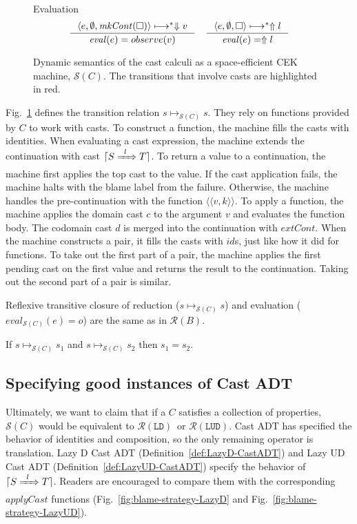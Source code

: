 \documentclass[runningheads]{llncs}
\newcommand{\infr}[2]{\inference{#1}{#2}}
\newcommand{\figref}[1]{Fig.~\ref{#1}}
\newcommand{\RMachine}[1]{\ensuremath{\mathcal{R}(#1)}}
\newcommand{\LDMachine}{\RMachine{\BLD}}
\newcommand{\LUDMachine}{\RMachine{\BLUD}}
\newcommand{\SMachine}[1]{\ensuremath{\mathcal{S}(#1)}}
\newcommand{\error}[1]{\ensuremath{\Uparrow#1}}
\newcommand{\ccast}[3]{#1 \xRightarrow[]{\enskip #2 \enskip} #3}
\newcommand{\BLD}[0]{\ensuremath{\mathtt{LD}}}
\newcommand{\BLUD}[0]{\ensuremath{\mathtt{LUD}}}
\newcommand{\sexpr}[3]{\ensuremath{\langle#1,#2,#3\rangle}}
\newcommand{\shalt}[1]{\ensuremath{\Downarrow #1}}
\newcommand{\Knil}[0]{\Box}
\newcommand{\translate}[1]{\ensuremath{\lceil#1\rceil}}
\newcommand{\mkCont}[1]{\ensuremath{\mathit{mkCont}(#1)}}
\newcommand{\applyCont}[2]{\ensuremath{\langle\langle#1,#2\rangle\rangle}}
\newcommand{\transitivelyreduceto}[2]{\ensuremath{#1 \longmapsto^{*} #2}}
\newcommand{\reducetoS}[3]{\ensuremath{#2 \longmapsto_{\SMachine{#1}} #3}}
\newcommand{\evalto}[2]{\ensuremath{\mathit{eval}(#1)=#2}}
\newcommand{\evaltoS}[3]{\ensuremath{\mathit{eval}_{\SMachine{#1}}(#2)=#3}}
\begin{document}
\begin{figure}
	\fbox{\evalto{e}{o}} Evaluation
	\[
	\inference{
		\transitivelyreduceto{\sexpr{e}{\emptyset}{\mkCont{\Knil}}}{\shalt{v}}
	}{
		\evalto{e}{observe(v)}
	} \quad
	\infr{
		\transitivelyreduceto{\sexpr{e}{\emptyset}{\Knil}}{\error{l}}
	}{
		\evalto{e}{\error{l}}}
	\]
	\caption{Dynamic semantics of the cast calculi as a 
	space-efficient CEK	machine, \SMachine{C}. The transitions that involve 
	casts are highlighted
		in red.}
	\label{fig:semachine-dynamics}
\end{figure}

\figref{fig:semachine-dynamics} defines the transition relation 
$\reducetoS{C}{s}{s}$. They rely on functions provided 
by $C$ to work with casts.
%
To construct a function, the machine fills the casts with identities.
%
When evaluating a cast expression, the machine extends the continuation with 
cast \translate{\ccast{S}{l}{T}}.
%
To return a value to a continuation, the machine first applies the top cast to 
the value. If the cast application fails, the machine halts with the blame 
label from the failure. Otherwise, the machine handles the pre-continuation 
with the function $\applyCont{v}{k}$.
%
To apply a function, the machine applies the domain cast $c$ to the 
argument $v$ and evaluates the function body. The codomain cast $d$ is merged 
into the continuation with $\textit{extCont}$.
%
When the machine constructs a pair, it fills the casts with $id$s, just 
like how it did for functions. 
%
To take out the first part of a pair, the machine applies the first pending 
cast on the first value and returns the result to the continuation.
%
Taking out the second part of a pair is similar.

Reflexive transitive closure of reduction ($\reducetoS{C}{s}{s}$) and
evaluation ($\evaltoS{C}{e}{o}$) are the same as in \RMachine{B}.

\begin{proposition}[\SMachine{C} is deterministic]
	\label{prop:SEMachine-deterministic}
	If $\reducetoS{C}{s}{s_1}$ and $\reducetoS{C}{s}{s_2}$ 
	then $s_1 = s_2$.
\end{proposition}

\subsection{Specifying good instances of Cast ADT}
\label{sec:good-cast-adt}

Ultimately, we want to claim that if a $C$ satisfies a collection of 
properties, \SMachine{C} would be equivalent to \LDMachine\ or \LUDMachine. 
Cast ADT has specified the behavior of identities and composition, so the only 
remaining operator is translation.
%
Lazy D Cast ADT (Definition~\ref{def:LazyD-CastADT}) and Lazy UD Cast ADT 
(Definition~\ref{def:LazyUD-CastADT}) specify the behavior 
of \translate{\ccast{S}{l}{T}}. Readers are encouraged to compare them with the 
corresponding $\mathit{applyCast}$ functions 
(Fig.~\ref{fig:blame-strategy-LazyD} and 
Fig.~\ref{fig:blame-strategy-LazyUD}).
\end{document}
